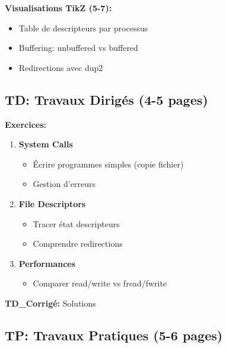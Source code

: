 \documentclass[10pt,a4paper]{article}
\begin{document}
\textbf{Visualisations TikZ (5-7):}
\begin{itemize}
\item Table de descripteurs par processus
\item Buffering: unbuffered vs buffered
\item Redirections avec dup2
\end{itemize}

\subsection*{TD: Travaux Dirigés (4-5 pages)}

\textbf{Exercices:}
\begin{enumerate}
\item \textbf{System Calls}
   \begin{itemize}
   \item Écrire programmes simples (copie fichier)
   \item Gestion d'erreurs
   \end{itemize}

\item \textbf{File Descriptors}
   \begin{itemize}
   \item Tracer état descripteurs
   \item Comprendre redirections
   \end{itemize}

\item \textbf{Performances}
   \begin{itemize}
   \item Comparer read/write vs fread/fwrite
   \end{itemize}
\end{enumerate}

\textbf{TD\_Corrigé:} Solutions

\subsection*{TP: Travaux Pratiques (5-6 pages)}
\end{document}
